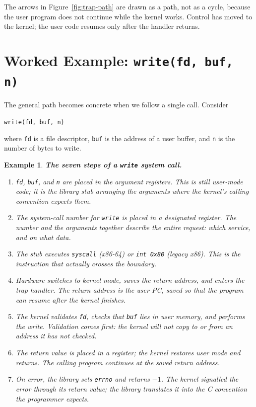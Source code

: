 \documentclass[11pt]{article}
\newtheorem{example}{Example}
\begin{document}
The arrows in Figure~\ref{fig:trap-path} are drawn as a path, not as a cycle,
because the user program does not continue while the kernel works. Control has
moved to the kernel; the user code resumes only after the handler returns.

\section{Worked Example: \texttt{write(fd, buf, n)}}

The general path becomes concrete when we follow a single call. Consider

\begin{center}
\texttt{write(fd, buf, n)}
\end{center}

\noindent
where \texttt{fd} is a file descriptor, \texttt{buf} is the address of a
user buffer, and \texttt{n} is the number of bytes to write.

\begin{example}
\textup{\textbf{The seven steps of a \texttt{write} system call.}}
\begin{enumerate}
  \item \texttt{fd}, \texttt{buf}, and \texttt{n} are placed in the argument
        registers. This is still user-mode code; it is the library stub
        arranging the arguments where the kernel's calling convention expects
        them.
  \item The system-call number for \texttt{write} is placed in a designated
        register. The number and the arguments together describe the entire
        request: which service, and on what data.
  \item The stub executes \texttt{syscall} (x86-64) or \texttt{int 0x80}
        (legacy x86). This is the instruction that actually crosses the
        boundary.
  \item Hardware switches to kernel mode, saves the return address, and enters
        the trap handler. The return address is the user PC, saved so that the
        program can resume after the kernel finishes.
  \item The kernel validates \texttt{fd}, checks that \texttt{buf} lies in
        user memory, and performs the write. Validation comes first: the
        kernel will not copy to or from an address it has not checked.
  \item The return value is placed in a register; the kernel restores user mode
        and returns. The calling program continues at the saved return address.
  \item On error, the library sets \texttt{errno} and returns $-1$. The kernel
        signalled the error through its return value; the library translates it
        into the C convention the programmer expects.
\end{enumerate}
\end{example}
\end{document}
